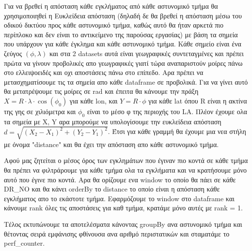 \documentclass[12pt, a4paper]{article}
\begin{document}
Για να βρεθεί η απόσταση κάθε εγκλήματος
από κάθε αστυνομικό τμήμα θα χρησιμοποιηθεί η Ευκλείδεια απόσταση (δηλαδή δε θα βρεθεί η απόσταση
μέσω του οδικού δικτύου προς κάθε αστυνομικό τμήμα, καθώς αυτό θα ήταν αρκετά πιο περίπλοκο και δεν είναι
το αντικείμενο της παρούσας εργασίας) με βάση τα σημεία που υπάρχουν για κάθε έγκλημα και κάθε 
αστυνομικό τμήμα. Κάθε σημείο είναι ένα ζεύγος $(\phi, \lambda)$ και στα 2 datasets αυτά είναι
γεωγραφικές συντεταγμένες και πρέπει πρώτα να γίνουν προβολικές απο γεωγραφικές γιατί τώρα
αναπαριστούν μοίρες πάνω στο ελλειψοειδές και οχι αποστάσεις πάνω στο επίπεδο. Αρα πρέπει να μετασχηματίσουμε
τις τα σημεία απο κάθε dataframe σε προβολικά. Για να γίνει αυτό θα μετατρέψουμε τις μοίρες σε
rad και έπειτα θα κάνουμε την πράξη $X = R \cdot \lambda \cdot \cos(\phi_0)$ για κάθε lon, 
και $Y = R \cdot \phi$ για κάθε lat όπου R είναι η ακτίνα της γης σε χιλιόμετρα και $\phi_0$
είναι το μέσο φ της περιοχής του LA. Πλέον έχουμε ολα τα σημεία με X, Y αρα μπορούμε να 
υπολογίσουμε την ευκλείδεια απόσταση $d = \sqrt{(X_2 - X_1)^2 + (Y_2 - Y_1)^2}$. Έτσι για κάθε γραμμή θα έχουμε μια νεα
στήλη με όνομα "distance" και θα έχει την απόσταση απο κάθε αστυνομικό τμήμα.


Αφού μας ζητείται ο μέσος όρος των εγκλημάτων που έγιναν πιο κοντά σε κάθε τμήμα θα πρέπει να 
φιλτράρουμε για κάθε τμήμα ολα τα εγκλήματα και να κρατήσουμε μόνο αυτό που έγινε πιο κοντά.
Αρα θα ορίζουμε ενα window το οποίο θα πάει σε κάθε DR\_NO και θα κάνει orderBy το distance
το οποίο είναι η απόσταση κάθε εγκλήματος απο το εκάστοτε τμήμα. Εφαρμόζουμε το window
στο dataframe και κάνουμε rank όλες τις αποστάσεις για καθ τμήμα, κρατάμε μόνο αυτές με rank = 1.

Τέλος εκτυπώνουμε τα αποτελέσματα κάνοντας groupBy ανα αστυνομικό τμήμα και θέτοντας σειρά
εμφάνισης φθίνουσα ανα αριθμό περιστατικών και σταματάμε το perf\_counter.
\end{document}
